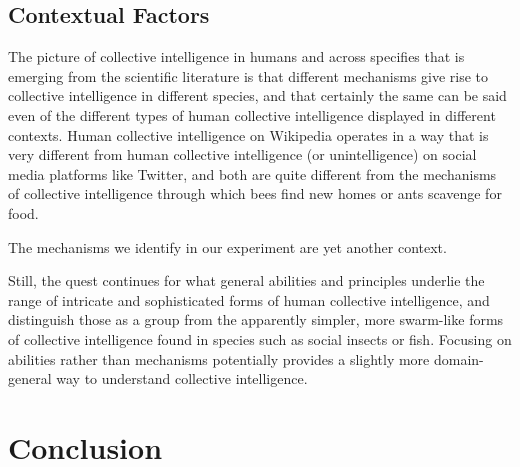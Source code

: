 \documentclass[12pt,letterpaper]{article}
\begin{document}

\subsection{Contextual Factors}

The picture of collective intelligence in humans and across specifies that is emerging from the scientific literature is that different mechanisms give rise to collective intelligence in different species, and that certainly the same can be said even of the different types of human collective intelligence displayed in different contexts.  Human collective intelligence on Wikipedia operates in a way that is very different from human collective intelligence (or unintelligence) on social media platforms like Twitter, and both are quite different from the mechanisms of collective intelligence through which bees find new homes or ants scavenge for food. 

The mechanisms we identify in our experiment are yet another context.

Still, the quest continues for what general abilities and principles underlie the range of intricate and sophisticated forms of human collective intelligence, and distinguish those as a group from the apparently simpler, more swarm-like forms of collective intelligence found in species such as social insects or fish.  Focusing on abilities rather than mechanisms potentially provides a slightly more domain-general way to understand collective intelligence.

\section{Conclusion}
\end{document}
